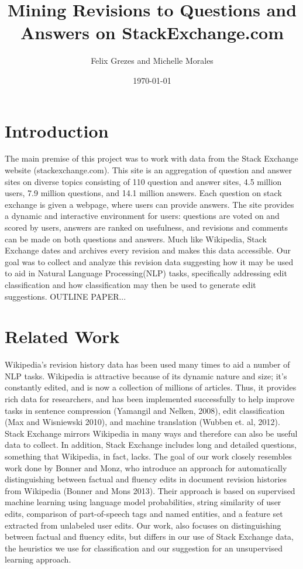 \documentclass[11pt, oneside]{article}   	%
\title{Mining Revisions to Questions and Answers on StackExchange.com}
\author{Felix Grezes and Michelle Morales}
\date{\today}							%
\begin{document}
\maketitle

\section{Introduction}
The main premise of this project was to work with data from the Stack Exchange website (stackexchange.com). This site is an aggregation of question and answer sites on diverse topics consisting of 110 question and answer sites, 4.5 million users, 7.9 million questions, and 14.1 million answers. Each question on stack exchange is given a webpage, where users can provide answers. The site provides a dynamic and interactive environment for users: questions are voted on and scored by users, answers are ranked on usefulness, and revisions and comments can be made on both questions and answers. Much like Wikipedia, Stack Exchange dates and archives every revision and makes this data accessible. Our goal was to collect and analyze this revision data suggesting how it may be used to aid in Natural Language Processing(NLP) tasks, specifically addressing edit classification and how classification may then be used to generate edit suggestions. OUTLINE PAPER...

\section{Related Work}
Wikipedia's revision history data has been used many times to aid a number of NLP tasks. Wikipedia is attractive because of its dynamic nature and size; it's constantly edited, and is now a collection of millions of articles. Thus, it provides rich data for researchers, and has been implemented successfully to help improve tasks in sentence compression (Yamangil and Nelken, 2008), edit classification (Max and Wisniewski 2010),  and machine translation (Wubben et. al, 2012). Stack Exchange mirrors Wikipedia in many ways and therefore can also be useful data to collect. In addition, Stack Exchange includes long and detailed questions, something that Wikipedia, in fact, lacks. The goal of our work closely resembles work done by Bonner and Monz, who introduce an approach for automatically distinguishing between factual and fluency edits in document revision histories from Wikipedia (Bonner and Mons 2013). Their approach is based on supervised machine learning using language model probabilities, string similarity of user edits, comparison of part-of-speech tags and named entities, and a feature set extracted from unlabeled user edits. Our work, also focuses on distinguishing between factual and fluency edits, but differs in our use of Stack Exchange data, the heuristics we use for classification and our suggestion for an unsupervised learning approach. 
\end{document}
